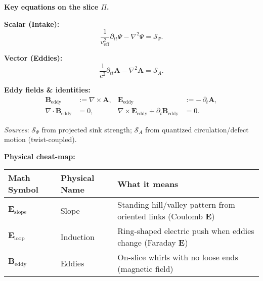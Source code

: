 \begin{tcolorbox}
\textbf{Key equations on the slice $\Pi$.}

\noindent\textbf{Scalar (Intake):}
\begin{equation}
\frac{1}{v_{\text{eff}}^{2}}\partial_{tt}\Psi - \nabla^{2}\Psi = \mathcal S_{\Psi}.
\label{eq:scalar-fw}
\end{equation}

\noindent\textbf{Vector (Eddies):}
\begin{equation}
\frac{1}{c^{2}}\partial_{tt}\mathbf A - \nabla^{2}\mathbf A = \boldsymbol{\mathcal S}_{A}.
\label{eq:vector-fw}
\end{equation}

\noindent\textbf{Eddy fields \& identities:}
\begin{subequations}\label{eq:eddy-block}
\begin{align}
\mathbf B_{\text{eddy}} &:= \nabla\times\mathbf A,
&
\mathbf E_{\text{eddy}} &:= -\,\partial_t \mathbf A,
\label{eq:eddy-fields}
\\
\nabla\!\cdot\!\mathbf B_{\text{eddy}} &= 0,
&
\nabla\times\mathbf E_{\text{eddy}}+\partial_t \mathbf B_{\text{eddy}} &= 0.
\label{eq:homogeneous-eddy}
\end{align}
\end{subequations}

\noindent\textit{Sources}: $\mathcal S_{\Psi}$ from projected sink strength;
$\boldsymbol{\mathcal S}_{A}$ from quantized circulation/defect motion (twist-coupled).

\medskip
\noindent\textbf{Physical cheat-map:}
\begin{center}
\begin{tabularx}{\linewidth}{|l|l|X|}
\hline
\textbf{Math Symbol} & \textbf{Physical Name} & \textbf{What it means} \\
\hline
$\mathbf{E}_{\text{slope}}$ & Slope & Standing hill/valley pattern from oriented links (Coulomb $\mathbf{E}$) \\
\hline
$\mathbf{E}_{\text{loop}}$ & Induction & Ring-shaped electric push when eddies change (Faraday $\mathbf{E}$) \\
\hline
$\mathbf{B}_{\text{eddy}}$ & Eddies & On-slice whirls with no loose ends (magnetic field) \\
\hline
\end{tabularx}
\end{center}
\end{tcolorbox}

